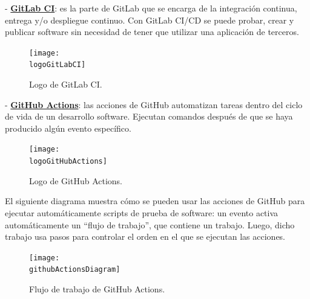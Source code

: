 - \textbf{\underline{GitLab CI}}: es la parte de GitLab que se encarga de la integración continua, entrega y/o despliegue continuo. Con GitLab CI/CD se puede probar, crear y publicar software sin necesidad de tener que utilizar una aplicación de terceros.
\begin{figure}[h]
    \centering
    \texttt{[image: \\logoGitLabCI]}
    \caption{Logo de GitLab CI.}
\end{figure}

- \textbf{\underline{GitHub Actions}}: las acciones de GitHub automatizan tareas dentro del ciclo de vida de un desarrollo software. Ejecutan comandos después de que se haya producido algún evento específico.

\begin{figure}[h]
    \centering
    \texttt{[image: \\logoGitHubActions]}
    \caption{Logo de GitHub Actions.}
\end{figure}

El siguiente diagrama muestra cómo se pueden usar las acciones de GitHub para ejecutar automáticamente scripts de prueba de software: un evento activa automáticamente un “flujo de trabajo”, que contiene un trabajo. Luego, dicho trabajo usa pasos para controlar el orden en el que se ejecutan las acciones. %
\begin{figure}[h]
    \centering
    \texttt{[image: \\githubActionsDiagram]}
    \caption{Flujo de trabajo de GitHub Actions.}
\end{figure}




